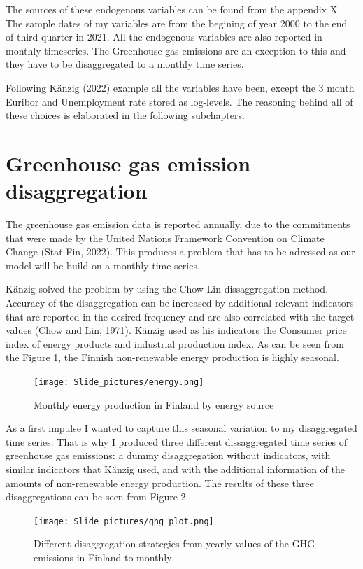 \documentclass[
  12pt,
  a4paper,
]{report}
\begin{document}
The sources of these endogenous variables can be found from the appendix X. The sample dates of my variables are from the begining of year 2000 to the end of third quarter in 2021. All the endogenous variables are also reported in monthly timeseries. The Greenhouse gas emissions are an exception to this and they have to be disaggregated to a monthly time series.

Following Känzig (2022) example all the variables have been, except the 3 month Euribor and Unemployment rate stored as log-levels. The reasoning behind all of these choices is elaborated in the following subchapters.

\hypertarget{greenhouse-gas-emission-disaggregation}{%
\section{Greenhouse gas emission disaggregation}\label{greenhouse-gas-emission-disaggregation}}

The greenhouse gas emission data is reported annually, due to the commitments that were made by the United Nations Framework Convention on Climate Change (Stat Fin, 2022). This produces a problem that has to be adressed as our model will be build on a monthly time series.

Känzig solved the problem by using the Chow-Lin dissaggregation method. Accuracy of the disaggregation can be increased by additional relevant indicators that are reported in the desired frequency and are also correlated with the target values (Chow and Lin, 1971). Känzig used as his indicators the Consumer price index of energy products and industrial production index. As can be seen from the Figure 1, the Finnish non-renewable energy production is highly seasonal.

\begin{figure}
\centering
\texttt{[image: Slide\_pictures/energy.png]}
\caption{Monthly energy production in Finland by energy source}
\end{figure}

As a first impulse I wanted to capture this seasonal variation to my disaggregated time series. That is why I produced three different dissaggregated time series of greenhouse gas emissions: a dummy disaggregation without indicators, with similar indicators that Känzig used, and with the additional information of the amounts of non-renewable energy production. The results of these three disaggregations can be seen from Figure 2.

\begin{figure}
\centering
\texttt{[image: Slide\_pictures/ghg\_plot.png]}
\caption{Different disaggregation strategies from yearly values of the GHG emissions in Finland to monthly}
\end{figure}
\end{document}
